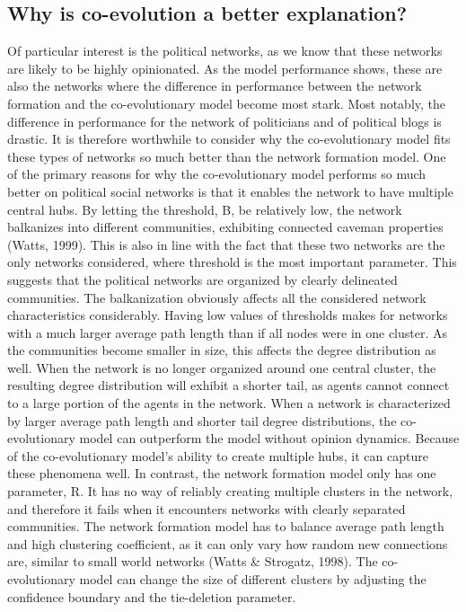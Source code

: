 \documentclass{article}
\begin{document}
\subsection{Why is co-evolution a better explanation?}

Of particular interest is the political networks, as we know that these networks are likely to be highly opinionated. As the model performance shows, these are also the networks where the difference in performance between the network formation and the co-evolutionary model become most stark. Most notably, the difference in performance for the network of politicians and of political blogs is drastic. It is therefore worthwhile to consider why the co-evolutionary model fits these types of networks so much better than the network formation model.
One of the primary reasons for why the co-evolutionary model performs so much better on political social networks is that it enables the network to have multiple central hubs. By letting the threshold, B, be relatively low, the network balkanizes into different communities, exhibiting connected caveman properties (Watts, 1999). This is also in line with the fact that these two networks are the only networks considered, where threshold is the most important parameter. This suggests that the political networks are organized by clearly delineated communities. The balkanization obviously affects all the considered network characteristics considerably. Having low values of thresholds makes for networks with a much larger average path length than if all nodes were in one cluster.  As the communities become smaller in size, this affects the degree distribution as well. When the network is no longer organized around one central cluster, the resulting degree distribution will exhibit a shorter tail, as agents cannot connect to a large portion of the agents in the network. When a network is characterized by larger average path length and shorter tail degree distributions, the co-evolutionary model can outperform the model without opinion dynamics. Because of the co-evolutionary model’s ability to create multiple hubs, it can capture these phenomena well. In contrast, the network formation model only has one parameter, R. It has no way of reliably creating multiple clusters in the network, and therefore it fails when it encounters networks with clearly separated communities. The network formation model has to balance average path length and high clustering coefficient, as it can only vary how random new connections are, similar to small world networks (Watts \& Strogatz, 1998). The co-evolutionary model can change the size of different clusters by adjusting the confidence boundary and the tie-deletion parameter. 
\end{document}
